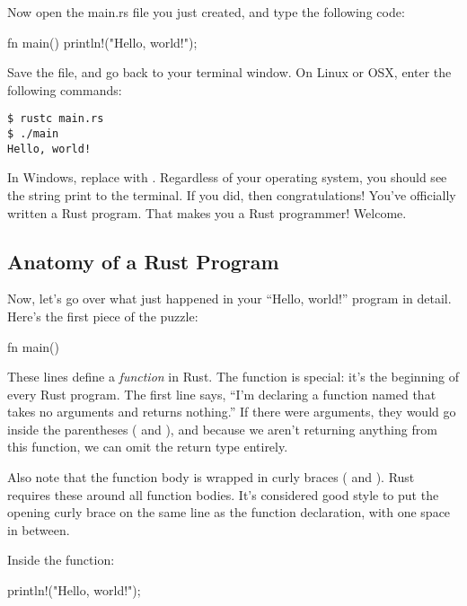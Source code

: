 \blank

Now open the main.rs file you just created, and type the following code:

\begin{rustc}
fn main() {
    println!("Hello, world!");
}
\end{rustc}

Save the file, and go back to your terminal window. On Linux or OSX, enter the following commands:

\begin{verbatim}
$ rustc main.rs
$ ./main
Hello, world!
\end{verbatim}

In Windows, replace  with . Regardless of your operating system, you should see the string 
 print to the terminal. If you did, then congratulations! You've officially written a Rust program. 
That makes you a Rust programmer! Welcome.

\subsection*{Anatomy of a Rust Program}

Now, let's go over what just happened in your \enquote{Hello, world!} program in detail. Here's the first piece of the puzzle:

\begin{rustc}
fn main() {
    
}
\end{rustc}

These lines define a \emph{function} in Rust. The  function is special: it's the beginning of every Rust program. The 
first line says, \enquote{I'm declaring a function named  that takes no arguments and returns nothing.} If there were 
arguments, they would go inside the parentheses (\code{(} and \code{)}), and because we aren't returning anything from this function, 
we can omit the return type entirely.

\blank

Also note that the function body is wrapped in curly braces (\code{\{} and \code{\}}). Rust requires these around all function
bodies. It's considered good style to put the opening curly brace on the same line as the function declaration, with one space 
in between.

\blank

Inside the  function:

\begin{rustc}
println!("Hello, world!");
\end{rustc}

